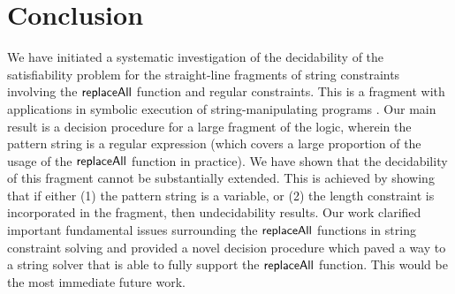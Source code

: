 
\section{Conclusion}

We have initiated a systematic investigation of the decidability of 
the satisfiability problem for the straight-line fragments of string 
constraints involving the $\mathsf{replaceAll}$ function and regular constraints.
This is a fragment with applications in symbolic execution of 
string-manipulating programs \cite{LB16,TCJ16}. Our main result is a decision 
procedure for a large fragment of the logic, wherein the pattern string is
a regular expression (which covers a large proportion of the usage of the 
$\mathsf{replaceAll}$ function in practice). We have shown that the decidability
of this fragment cannot be substantially extended. This is achieved by showing
that if either (1) the pattern string is a variable, or (2) the length
constraint is incorporated in the fragment, then undecidability results.
Our work clarified important fundamental issues surrounding the $\mathsf{replaceAll}$
functions in string constraint solving and provided a novel decision procedure
which paved a way to a string solver that is able to fully support the
$\mathsf{replaceAll}$ function. This would be the most immediate future work. 
